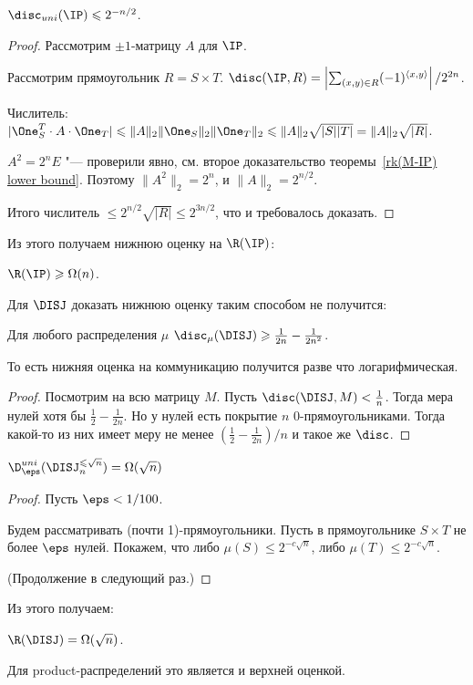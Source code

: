 \begin{theorem}
$\disc_{uni}(\IP) \leqslant 2^{-n/2}$.
\end{theorem}
\begin{proof}
Рассмотрим $\pm 1$-матрицу $A$ для $\IP$.

Рассмотрим прямоугольник $R = S\times T$. $\disc(\IP, R) = \left|\sum_{(x,y)\in R} (-1)^{\langle x, y\rangle}\right| / 2^{2n}$.

Числитель:
$|\One^T_S\cdot A\cdot \One_T| \leqslant
\lVert A\rVert_2 \lVert \One_S\rVert_2 \lVert \One_T\rVert_2 \leqslant
\lVert A\rVert_2 \sqrt{|S||T|} = 
\lVert A\rVert_2 \sqrt{|R|}
$.

$A^2 = 2^{n} E$ "--- проверили явно, см. второе доказательство теоремы~\ref{rk(M-IP) lower bound}.
Поэтому $\lVert A^2\rVert_2 = 2^n$, и $\lVert A\rVert_2=2^{n/2}$.

Итого числитель $\leqslant 2^{n/2}\sqrt{|R|} \leqslant 2^{3n/2}$, что и требовалось доказать.
\end{proof}

Из этого получаем нижнюю оценку на $\R(\IP)$:

\begin{theorem}
$\R(\IP)\geqslant \Omega(n)$.
\end{theorem}

Для $\DISJ$ доказать нижнюю оценку таким способом не получится:

\begin{proposition}
Для любого распределения $\mu$ $\disc_\mu(\DISJ)\geqslant \frac{1}{2n} - \frac{1}{2n^2}$.
\end{proposition}

То есть нижняя оценка на коммуникацию получится разве что логарифмическая.

\begin{proof}
Посмотрим на всю матрицу $M$.
Пусть $\disc(\DISJ, M) < \frac{1}{n}$.
Тогда мера нулей хотя бы $\frac{1}{2}-\frac{1}{2n}$.
Но у нулей есть покрытие $n$ 0-прямоугольниками.
Тогда какой-то из них имеет меру не менее $(\frac{1}{2}-\frac{1}{2n})/n$ и такое же $\disc$.
\end{proof}

\begin{theorem}[Babai et al.; 1986]
$\D^{uni}_{\eps}(\DISJ^{\leqslant \sqrt{n}}_n) = \Omega(\sqrt{n})$
\end{theorem}
\begin{proof}
Пусть $\eps < 1/100$.

Будем рассматривать (почти 1)-прямоугольники.
Пусть в прямоугольнике $S\times T$ не более $\eps$ нулей.
Покажем, что либо $\mu(S)\leqslant 2^{-c\sqrt{n}}$, либо $\mu(T)\leqslant 2^{-c\sqrt{n}}$.

(Продолжение в следующий раз.)
\end{proof}

Из этого получаем:

\begin{theorem}
$\R(\DISJ) = \Omega(\sqrt{n})$.
\end{theorem}

Для product-распределений это является и верхней оценкой.